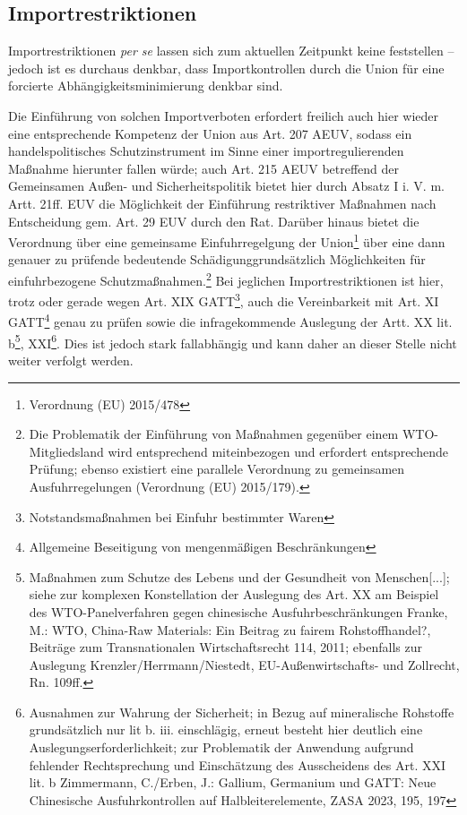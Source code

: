 \documentclass[12pt,a4paper,oneside]{book} %
\begin{document}
{	
	\subsection{Importrestriktionen}
	Importrestriktionen \textit{per se} lassen sich zum aktuellen Zeitpunkt keine feststellen -- jedoch ist es durchaus denkbar, dass Importkontrollen durch die Union für eine forcierte Abhängigkeitsminimierung denkbar sind.
	
	Die Einführung von solchen Importverboten erfordert freilich auch hier wieder eine entsprechende Kompetenz der Union aus Art. 207 AEUV, sodass ein handelspolitisches Schutzinstrument im Sinne einer importregulierenden Maßnahme hierunter fallen würde; auch Art. 215 AEUV betreffend der Gemeinsamen Außen- und Sicherheitspolitik bietet hier durch Absatz I i. V. m. Artt. 21ff. EUV die Möglichkeit der Einführung restriktiver Maßnahmen nach Entscheidung gem. Art. 29 EUV durch den Rat. Darüber hinaus bietet die Verordnung über eine gemeinsame Einfuhrregelgung der Union\footnote{Verordnung (EU) 2015/478} über eine dann genauer zu prüfende \glqq bedeutende Schädigung\grqq grundsätzlich Möglichkeiten für einfuhrbezogene Schutzmaßnahmen.\footnote{Die Problematik der Einführung von Maßnahmen gegenüber einem WTO-Mitgliedsland wird entsprechend miteinbezogen und erfordert entsprechende Prüfung; ebenso existiert eine parallele Verordnung zu gemeinsamen Ausfuhrregelungen (Verordnung (EU) 2015/179).} Bei jeglichen Importrestriktionen ist hier, trotz oder gerade wegen Art. XIX GATT\footnote{Notstandsmaßnahmen bei Einfuhr bestimmter Waren}, auch die Vereinbarkeit mit Art. XI GATT\footnote{Allgemeine Beseitigung von mengenmäßigen Beschränkungen} genau zu prüfen sowie die infragekommende Auslegung der Artt. XX lit. b\footnote{Maßnahmen zum Schutze des Lebens und der Gesundheit von Menschen[...]; siehe zur komplexen Konstellation der Auslegung des Art. XX am Beispiel des WTO-Panelverfahren gegen chinesische Ausfuhrbeschränkungen Franke, M.: WTO, China-Raw Materials: Ein Beitrag zu fairem Rohstoffhandel?, Beiträge zum Transnationalen Wirtschaftsrecht 114, 2011; ebenfalls zur Auslegung Krenzler/Herrmann/Niestedt, EU-Außenwirtschafts- und Zollrecht, Rn. 109ff.}, XXI\footnote{Ausnahmen zur Wahrung der Sicherheit; in Bezug auf mineralische Rohstoffe grundsätzlich nur lit b. iii. einschlägig, erneut besteht hier deutlich eine Auslegungserforderlichkeit; zur Problematik der Anwendung aufgrund fehlender Rechtsprechung und Einschätzung des Ausscheidens des Art. XXI lit. b Zimmermann, C./Erben, J.: Gallium, Germanium und GATT: Neue Chinesische Ausfuhrkontrollen auf Halbleiterelemente, ZASA 2023, 195, 197}. Dies ist jedoch stark fallabhängig und kann daher an dieser Stelle nicht weiter verfolgt werden.
	
}
\end{document}
